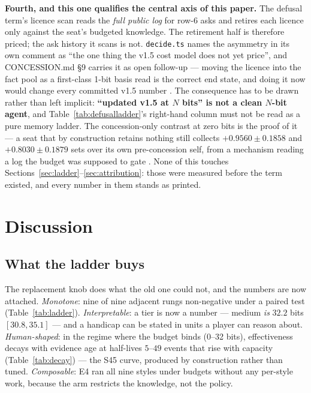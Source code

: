\documentclass[11pt]{article}
\newcommand{\code}[1]{\texttt{#1}}
\begin{document}
\textbf{Fourth, and this one qualifies the central axis of this paper.} The defusal term's
licence scan reads the \emph{full public log} for row-6 asks and retires each licence only
against the seat's budgeted knowledge. The retirement half is therefore priced; the ask history
it scans is not. \code{decide.ts} names the asymmetry in its own comment as ``the one thing the
v1.5 cost model does not yet price'', and CONCESSION.md \S9 carries it as open follow-up ---
moving the licence into the fact pool as a first-class 1-bit basis read is the correct end state,
and doing it now would change every committed v1.5 number \cite{repo,concession}. The consequence
has to be drawn rather than left implicit: \textbf{``updated v1.5 at $N$ bits'' is not a clean
$N$-bit agent}, and Table~\ref{tab:defusalladder}'s right-hand column must not be read as a pure
memory ladder. The concession-only contrast at zero bits is the proof of it --- a seat that by
construction retains nothing still collects $+0.9560 \pm 0.1858$ and $+0.8030 \pm 0.1879$ sets
over its own pre-concession self, from a mechanism reading a log the budget was supposed to gate
\cite{v15clean}. None of this touches
Sections~\ref{sec:ladder}--\ref{sec:attribution}: those were measured before the term existed,
and every number in them stands as printed.

\section{Discussion}
\label{sec:discussion}

\subsection{What the ladder buys}
\label{sec:buys}

The replacement knob does what the old one could not, and the numbers are now attached.
\emph{Monotone}: nine of nine adjacent rungs non-negative under a paired test
(Table~\ref{tab:ladder}). \emph{Interpretable}: a tier is now a number --- medium
\emph{is} $32.2$ bits $[30.8, 35.1]$ --- and a handicap can be stated in units a player
can reason about. \emph{Human-shaped}: in the regime where the budget binds (0--32
bits), effectiveness decays with evidence age at half-lives $5$--$49$ events that rise
with capacity (Table~\ref{tab:decay}) --- the S45 curve, produced by construction
rather than tuned. \emph{Composable}: E4 ran all nine styles under budgets without any
per-style work, because the arm restricts the knowledge, not the policy.
\end{document}
